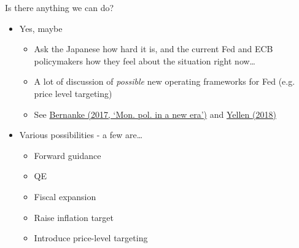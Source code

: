 \begin{frame}{Is there anything we can do?}

\begin{itemize}
\item	Yes, maybe
	\begin{itemize}
	\item	Ask the Japanese how hard it is, and the current Fed and ECB policymakers how they feel about the situation right now\ldots
	\item	A lot of discussion of \textit{possible} new operating frameworks for Fed (e.g. price level targeting)
	\item	See \href{https://www.brookings.edu/research/monetary-policy-in-a-new-era/}{Bernanke (2017, `Mon. pol. in a new era')} and \href{https://www.brookings.edu/blog/up-front/2018/09/14/comments-on-monetary-policy-at-the-effective-lower-bound/}{Yellen (2018)}
	\end{itemize}
\vspace{2mm}
\item	Various possibilities - a few are\ldots
	\begin{itemize}
	\item	Forward guidance
	\item	QE
	\item	Fiscal expansion
	\item	Raise inflation target
	\item	Introduce price-level targeting
	\end{itemize}
\end{itemize}

\end{frame}


	
